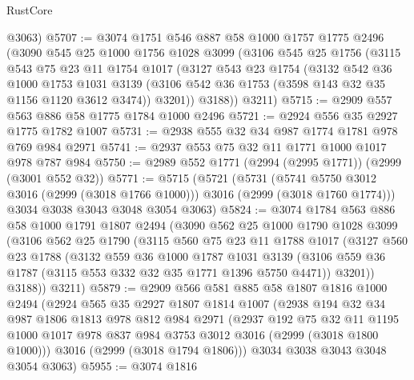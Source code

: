 \begin{lexlean}{RustCore}
\begin{coremodule}
      @3063)
@5707 := @3074
    @1751
    @546
    @887
    @58
    @1000
    @1757
    @1775
    @2496
    (@3090
      @545
      @25
      @1000
      @1756
      @1028
      @3099
      (@3106
        @545
        @25
        @1756
        (@3115
          @543
          @75
          @23
          @11
          @1754
          @1017
          (@3127
            @543
            @23
            @1754
            (@3132
              @542
              @36
              @1000
              @1753
              @1031
              @3139
              (@3106 @542 @36 @1753 (@3598 @143 @32 @35 @1156 @1120 @3612 @3474))
              @3201))
          @3188))
      @3211)
@5715 := @2909 @557 @563 @886 @58 @1775 @1784 @1000 @2496
@5721 := @2924 @556 @35 @2927 @1775 @1782 @1007
@5731 := @2938 @555 @32 @34 @987 @1774 @1781 @978 @769 @984 @2971
@5741 := @2937 @553 @75 @32 @11 @1771 @1000 @1017 @978 @787 @984
@5750 := @2989 @552 @1771 (@2994 (@2995 @1771)) (@2999 (@3001 @552 @32))
@5771 := @5715
    (@5721
      (@5731
        (@5741 @5750 @3012 @3016 (@2999 (@3018 @1766 @1000)))
        @3016
        (@2999 (@3018 @1760 @1774)))
      @3034
      @3038
      @3043
      @3048
      @3054
      @3063)
@5824 := @3074
    @1784
    @563
    @886
    @58
    @1000
    @1791
    @1807
    @2494
    (@3090
      @562
      @25
      @1000
      @1790
      @1028
      @3099
      (@3106
        @562
        @25
        @1790
        (@3115
          @560
          @75
          @23
          @11
          @1788
          @1017
          (@3127
            @560
            @23
            @1788
            (@3132
              @559
              @36
              @1000
              @1787
              @1031
              @3139
              (@3106 @559 @36 @1787 (@3115 @553 @332 @32 @35 @1771 @1396 @5750 @4471))
              @3201))
          @3188))
      @3211)
@5879 := @2909
    @566
    @581
    @885
    @58
    @1807
    @1816
    @1000
    @2494
    (@2924
      @565
      @35
      @2927
      @1807
      @1814
      @1007
      (@2938
        @194
        @32
        @34
        @987
        @1806
        @1813
        @978
        @812
        @984
        @2971
        (@2937
          @192
          @75
          @32
          @11
          @1195
          @1000
          @1017
          @978
          @837
          @984
          @3753
          @3012
          @3016
          (@2999 (@3018 @1800 @1000)))
        @3016
        (@2999 (@3018 @1794 @1806)))
      @3034
      @3038
      @3043
      @3048
      @3054
      @3063)
@5955 := @3074
    @1816

\end{coremodule}
\end{lexlean}
